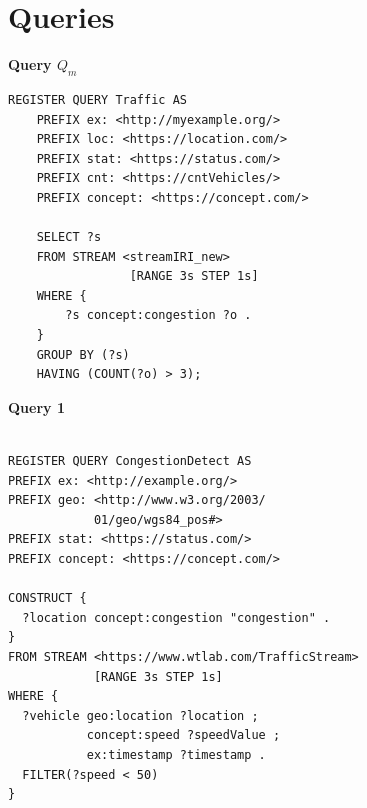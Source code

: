 \documentclass[5p,times]{elsarticle}
\begin{document}





%





\appendix

\section{Queries}
\label{sec:AppendixQueries}


\textbf{Query \(Q_m\)}
\begin{verbatim}
REGISTER QUERY Traffic AS
    PREFIX ex: <http://myexample.org/>
    PREFIX loc: <https://location.com/>
    PREFIX stat: <https://status.com/>
    PREFIX cnt: <https://cntVehicles/>
    PREFIX concept: <https://concept.com/>

    SELECT ?s
    FROM STREAM <streamIRI_new>
                 [RANGE 3s STEP 1s]
    WHERE {
        ?s concept:congestion ?o .
    }
    GROUP BY (?s)
    HAVING (COUNT(?o) > 3);
\end{verbatim}



\textbf{Query 1}

\begin{verbatim}

REGISTER QUERY CongestionDetect AS
PREFIX ex: <http://example.org/>
PREFIX geo: <http://www.w3.org/2003/
            01/geo/wgs84_pos#>
PREFIX stat: <https://status.com/>
PREFIX concept: <https://concept.com/>

CONSTRUCT {
  ?location concept:congestion "congestion" .
}
FROM STREAM <https://www.wtlab.com/TrafficStream>
            [RANGE 3s STEP 1s]
WHERE {
  ?vehicle geo:location ?location ;
           concept:speed ?speedValue ;
           ex:timestamp ?timestamp .
  FILTER(?speed < 50)
}

\end{verbatim}
\end{document}
